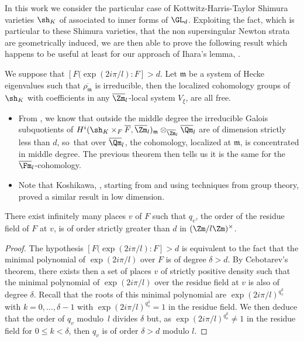 In this work we consider the particular case of Kottwitz-Harris-Taylor Shimura varieties $\sh_K$
of \cite{h-t} associated to inner forms of $\GL_d$. Exploiting the fact, which is particular to these Shimura
varieties, that the non supersingular Newton strata are geometrically induced, we are then able to
prove the following result which happens to be useful at least for our approach of
Ihara's lemma, \cf \cite{boyer-ihara}.

\begin{thm*}
We suppose that $[F(\exp(2i\pi/l):F]>d$.
Let $\mathfrak m$ be a system of Hecke eigenvalues
such that $\overline{\rho_{\mathfrak m}}$
is irreducible, then the localized cohomology groups of $\sh_K$ with coefficients in any
$\overline \Zm_l$-local system $V_\xi$, are all free.
\end{thm*}

\skpt
\begin{remarks}
\begin{itemize}
\item
From \cite[\S4]{boyer-compositio}, we know that outside
the middle degree the irreducible Galois subquotients of
$H^i(\sh_K \times_F \overline F,\overline \Zm_l)_{\mathfrak m} \otimes_{\overline \Zm_l} \overline \Qm_l$ are of dimension strictly less than $d$, so~that
over $\overline \Qm_l$, the cohomology, localized at $\mathfrak m$,
is concentrated in middle degree. The previous theorem then tells us
it is the same for the $\overline \Fm_l$-cohomology.

\item
Note that Koshikawa, \cf \cite{koshikawa}, starting from \cite{boyer-imj} and using techniques from group theory, proved a similar result in low dimension.
\end{itemize}
\end{remarks}

\begin{lem*}
There exist infinitely many places $v$ of $F$ such that $q_v$, the order of the residue field of $F$ at $v$,
is of order strictly greater than $d$ in $(\Zm/l\Zm)^\times$.
\end{lem*}

\begin{proof}
The hypothesis $[F(\exp(2i\pi/l):F]>d$ is equivalent to the fact that the minimal polynomial
of $\exp(2i\pi/l)$ over $F$ is of degree $\delta> d$. By Cebotarev's
theorem, there exists then a set of places $v$ of strictly positive density such that the minimal polynomial of $\exp(2i\pi/l)$ over the residue field at $v$
is also of degree $\delta$. Recall that the roots
of this minimal polynomial are $\exp(2i\pi/l)^{q_v^k}$ with $k=0,\dots,
\delta-1$ with $\exp(2i\pi/l)^{q_v^{\delta}} =1$ in the residue field.
We then deduce that the order of $q_v$ modulo~$l$ divides $\delta$ but,
as $\exp(2i\pi/l)^{q_v^k} \neq 1$ in the residue field for $0 \leq k < \delta$,
then $q_v$ is of order $\delta > d$ modulo $l$.
\end{proof}

